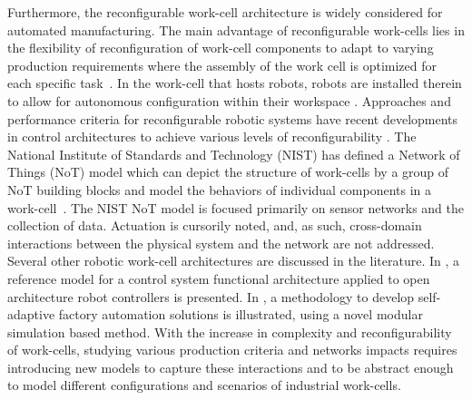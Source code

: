 Furthermore, the reconfigurable work-cell architecture is widely considered for automated manufacturing. The main advantage of reconfigurable work-cells lies in the flexibility of reconfiguration of work-cell components to adapt to varying production requirements where the assembly of the work cell is optimized for each specific task~\cite{CHEN2001199}. In the work-cell that hosts robots, robots are installed therein to allow for autonomous configuration within their workspace \cite{8023523,10.1007/978-3-319-65151-4_10,6059204}. Approaches and performance criteria for reconfigurable robotic systems have recent developments in control architectures to achieve various levels of reconfigurability \cite{Fulea}. The National Institute of Standards and Technology (NIST) has defined a Network of Things (NoT) model which can depict the structure of work-cells by a group of NoT building blocks and model the behaviors of individual components in a work-cell~\cite{NIST800-183}.  The NIST NoT model is focused primarily on sensor networks and the collection of data.  Actuation is cursorily noted, and, as such, cross-domain interactions between the physical system and the network are not addressed. Several other robotic work-cell architectures are discussed in the literature. In \cite{OpenArch}, a reference model for a control system functional architecture applied to open architecture robot controllers is presented. In \cite{CARPANZANO2007435}, a methodology to develop self-adaptive factory automation solutions is illustrated, using a novel modular simulation based method. With the increase in complexity and reconfigurability of work-cells, studying various production criteria and networks impacts requires introducing new models to capture these interactions and to be abstract enough to model different configurations and scenarios of industrial work-cells.  

